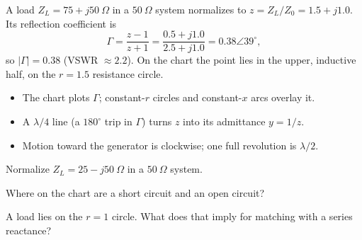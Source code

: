 \begin{workedexample}
A load $Z_L = 75 + j50\ \Omega$ in a $50\ \Omega$ system normalizes to
$z = Z_L/Z_0 = 1.5 + j1.0$. Its reflection coefficient is
\[ \Gamma = \frac{z-1}{z+1} = \frac{0.5 + j1.0}{2.5 + j1.0} = 0.38\angle 39^{\circ}, \]
so $|\Gamma| = 0.38$ (VSWR $\approx 2.2$). On the chart the point lies in the
upper, inductive half, on the $r = 1.5$ resistance circle.
\end{workedexample}

\begin{keytakeaways}
\begin{itemize}[leftmargin=1.4em,itemsep=2pt]
\item The chart plots $\Gamma$; constant-$r$ circles and constant-$x$ arcs overlay it.
\item A $\lambda/4$ line (a $180^{\circ}$ trip in $\Gamma$) turns $z$ into its admittance $y = 1/z$.
\item Motion toward the generator is clockwise; one full revolution is $\lambda/2$.
\end{itemize}
\end{keytakeaways}

\begin{exercises}
\item Normalize $Z_L = 25 - j50\ \Omega$ in a $50\ \Omega$ system.
\item Where on the chart are a short circuit and an open circuit?
\item A load lies on the $r = 1$ circle. What does that imply for matching with a series reactance?
\end{exercises}

